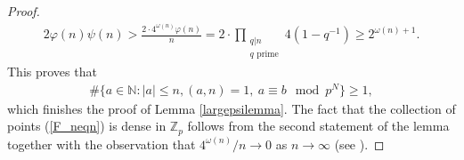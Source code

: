 \documentclass[12pt,reqno]{amsart}
\begin{document}
\begin{proof}
\begin{align*}
2\varphi(n)\psi (n)>\frac{2\cdot 4^{\omega (n)}\varphi (n)}{n}=2\cdot\prod_{\substack{q|n\\q\text{ prime}}}4\left(1-q^{-1}\right)\ge 2^{\omega (n)+1}.
\end{align*}
This proves that
\begin{align*}
\#\{a\in{\mathbb{N}} : |a|\le n, (a,n)=1,~ a\equiv b\mod p^N\}\ge 1,
\end{align*}
which finishes the proof of Lemma \ref{largepsilemma}. The fact that the collection of points (\ref{F_neqn}) is dense in ${\mathbb{Z}}_p$ follows from the second statement of the lemma together with the observation that $4^{\omega(n)}/n{\rightarrow} 0$ as $n{\rightarrow}\infty$ (see \cite[Section 22.10]{HardyWright}).
\end{proof}
\end{document}
